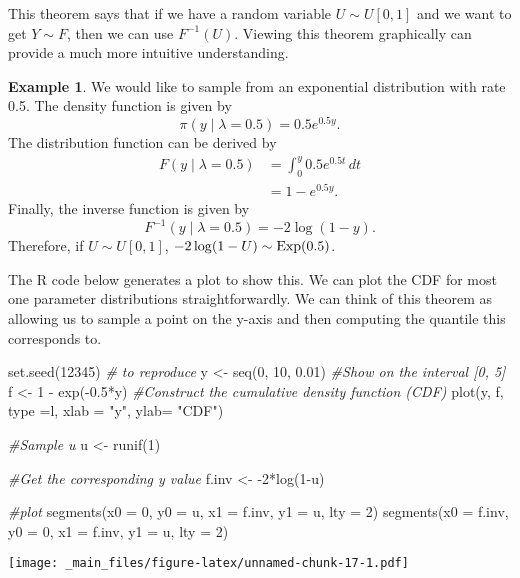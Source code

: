 \documentclass[
]{book}
\newenvironment{Shaded}{\begin{snugshade}}{\end{snugshade}}
\newcommand{\AttributeTok}[1]{\textcolor[rgb]{0.77,0.63,0.00}{#1}}
\newcommand{\CommentTok}[1]{\textcolor[rgb]{0.56,0.35,0.01}{\textit{#1}}}
\newcommand{\DecValTok}[1]{\textcolor[rgb]{0.00,0.00,0.81}{#1}}
\newcommand{\FloatTok}[1]{\textcolor[rgb]{0.00,0.00,0.81}{#1}}
\newcommand{\FunctionTok}[1]{\textcolor[rgb]{0.00,0.00,0.00}{#1}}
\newcommand{\NormalTok}[1]{#1}
\newcommand{\OtherTok}[1]{\textcolor[rgb]{0.56,0.35,0.01}{#1}}
\newcommand{\SpecialCharTok}[1]{\textcolor[rgb]{0.00,0.00,0.00}{#1}}
\newcommand{\StringTok}[1]{\textcolor[rgb]{0.31,0.60,0.02}{#1}}
\theoremstyle{definition}
\theoremstyle{definition}
\newtheorem{example}{Example}[chapter]
\theoremstyle{definition}
\theoremstyle{definition}
\theoremstyle{remark}
\begin{document}
This theorem says that if we have a random variable \(U \sim U[0, 1]\) and we want to get \(Y \sim F\), then we can use \(F^{-1}(U)\). Viewing this theorem graphically can provide a much more intuitive understanding.

\begin{example}
We would like to sample from an exponential distribution with rate 0.5. The density function is given by
\[
\pi(y \mid \lambda = 0.5) = 0.5e^{0.5y}.
\]
The distribution function can be derived by
\begin{align*}
F(y \mid \lambda = 0.5) &= \int_0^y 0.5e^{0.5t}\,dt \\
& =  1 - e^{0.5y}.
\end{align*}
Finally, the inverse function is given by
\[
F^{-1}(y \mid \lambda = 0.5) = -2\log(1-y).  
\]
Therefore, if \(U \sim U[0, 1]\), \(-2\log(1-U) \sim \hbox{Exp}(0.5)\).

The R code below generates a plot to show this. We can plot the CDF for most one parameter distributions straightforwardly. We can think of this theorem as allowing us to sample a point on the y-axis and then computing the quantile this corresponds to.

\begin{Shaded}
\begin{Highlighting}[]
\FunctionTok{set.seed}\NormalTok{(}\DecValTok{12345}\NormalTok{) }\CommentTok{\# to reproduce}
\NormalTok{y }\OtherTok{\textless{}{-}} \FunctionTok{seq}\NormalTok{(}\DecValTok{0}\NormalTok{, }\DecValTok{10}\NormalTok{, }\FloatTok{0.01}\NormalTok{) }\CommentTok{\#Show on the interval [0, 5]}
\NormalTok{f }\OtherTok{\textless{}{-}} \DecValTok{1} \SpecialCharTok{{-}} \FunctionTok{exp}\NormalTok{(}\SpecialCharTok{{-}}\FloatTok{0.5}\SpecialCharTok{*}\NormalTok{y)    }\CommentTok{\#Construct the cumulative density function (CDF)}
\FunctionTok{plot}\NormalTok{(y, f, }\AttributeTok{type =}\StringTok{\textquotesingle{}l\textquotesingle{}}\NormalTok{, }\AttributeTok{xlab =} \StringTok{"y"}\NormalTok{, }\AttributeTok{ylab=} \StringTok{"CDF"}\NormalTok{)}

\CommentTok{\#Sample u}
\NormalTok{u }\OtherTok{\textless{}{-}} \FunctionTok{runif}\NormalTok{(}\DecValTok{1}\NormalTok{)}

\CommentTok{\#Get the corresponding y value}
\NormalTok{f.inv }\OtherTok{\textless{}{-}} \SpecialCharTok{{-}}\DecValTok{2}\SpecialCharTok{*}\FunctionTok{log}\NormalTok{(}\DecValTok{1}\SpecialCharTok{{-}}\NormalTok{u)}

\CommentTok{\#plot }
\FunctionTok{segments}\NormalTok{(}\AttributeTok{x0 =} \DecValTok{0}\NormalTok{, }\AttributeTok{y0 =}\NormalTok{ u, }\AttributeTok{x1 =}\NormalTok{ f.inv, }\AttributeTok{y1 =}\NormalTok{ u, }\AttributeTok{lty =} \DecValTok{2}\NormalTok{)}
\FunctionTok{segments}\NormalTok{(}\AttributeTok{x0 =}\NormalTok{ f.inv, }\AttributeTok{y0 =} \DecValTok{0}\NormalTok{, }\AttributeTok{x1 =}\NormalTok{ f.inv, }\AttributeTok{y1 =}\NormalTok{ u, }\AttributeTok{lty =} \DecValTok{2}\NormalTok{)}
\end{Highlighting}
\end{Shaded}

\texttt{[image: \_main\_files/figure-latex/unnamed-chunk-17-1.pdf]}
\end{example}
\end{document}
